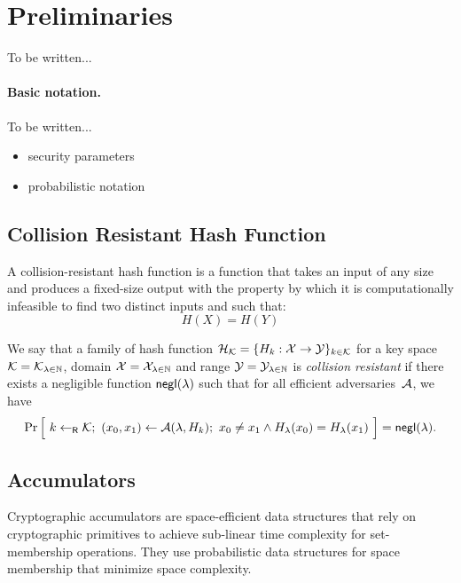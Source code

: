 \section{Preliminaries}

To be written...

\paragraph{Basic notation.}
\label{sec:notation}

To be written...
\begin{itemize}[noitemsep]
    \item security parameters
    \item probabilistic notation
\end{itemize}

\subsection{Collision Resistant Hash Function}

A collision-resistant hash function is a function  that takes an input of any size and produces a fixed-size output with the property by which it is computationally infeasible to find two distinct inputs  and  such that: 
\begin{equation} H(X) = H(Y)\end{equation}

\newcommand{\getsr}{\gets_{\ms{R}}}

\begin{definition}
    We say that a family of hash function $\mathcal{H}_{\mathcal{K}} = \{ H_k: \mathcal{X} \to
    \mathcal{Y} \}_{k \in \mathcal{K}}$ for a key space $\mathcal{K} = \mathcal{K}_{\lambda \in \mathbb{N}}$,
    domain $\mathcal{X} = \mathcal{X}_{\lambda \in \mathbb{N}}$ and range $\mathcal{Y} = \mathcal{Y}_{\lambda
    \in \mathbb{N}}$ is \emph{collision resistant} if there exists a negligible
    function $\mathsf{negl}(\lambda)$ such that for all efficient adversaries~$\mathcal{A}$,
    we have
    \[ \Pr\Big[~ k \getsr \calK;~ (x_0, x_1) \gets \calA(\lambda, H_k);~
    x_0 \neq x_1 \land H_\lambda(x_0) = H_\lambda(x_1) ~\Big] = \negl(\lambda)
.\]
\end{definition}

\subsection{Accumulators}
    Cryptographic accumulators are space-efficient data structures that rely
    on cryptographic primitives to achieve sub-linear time complexity for set-membership operations. They use probabilistic data structures for space membership that minimize space complexity. 
\newcommand{\Piacc}{\Pi_\ms{acc}}


